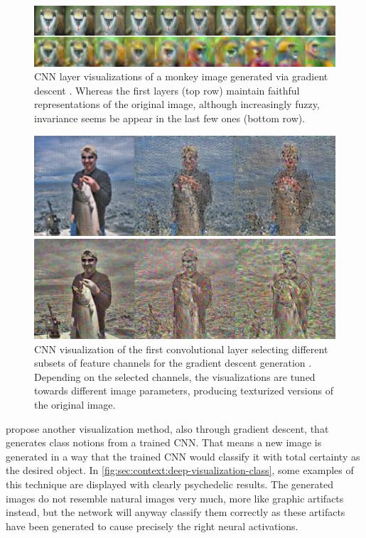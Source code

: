 \begin{figure}[b]
  \includegraphics[width=\textwidth]{gfx/deep-visualization-reconstructions-1}
  \caption{
    CNN layer visualizations of a monkey image generated via gradient descent \cite{Mahendran2014}.
    Whereas the first layers (top row) maintain faithful representations of the original image, although increasingly fuzzy, invariance seems be appear in the last few ones (bottom row).
  }
  \label{fig:sec:context:deep-visualization:deep-visualization-reconstructions-1}
\end{figure}

\begin{figure}[t]
  \includegraphics[width=\textwidth]{gfx/deep-visualization-reconstructions-2}
  \caption{
    CNN visualization of the first convolutional layer selecting different subsets of feature channels for the gradient descent generation \cite{Mahendran2014}.
    Depending on the selected channels, the visualizations are tuned towards different image parameters, producing texturized versions of the original image.
  }
  \label{fig:sec:context:deep-visualization:deep-visualization-reconstructions-2}
\end{figure}

\citet{Simonyan2014B} propose another visualization method, also through gradient descent, that generates class notions from a trained CNN.
That means a new image is generated in a way that the trained CNN would classify it with total certainty as the desired object.
In \autoref{fig:sec:context:deep-visualization-class}, some examples of this technique are displayed with clearly psychedelic results.
The generated images do not resemble natural images very much, more like graphic artifacts instead, but the network will anyway classify them correctly as these artifacts have been generated to cause precisely the right neural activations.

